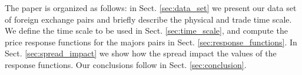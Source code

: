 The paper is organized as follows: in Sect. \ref{sec:data_set} we present our
data set of foreign exchange pairs and briefly describe the physical and trade
time scale. We define the time scale to be used in Sect. \ref{sec:time_scale},
and compute the price response functions for the majors pairs in Sect.
\ref{sec:response_functions}. In Sect. \ref{sec:spread_impact} we show how
the spread impact the values of the response functions. Our conclusions follow
in Sect. \ref{sec:conclusion}.